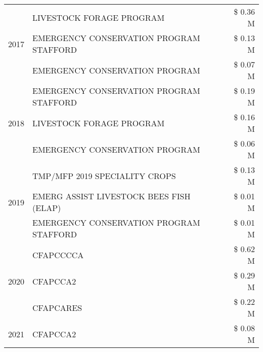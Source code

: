 \begin{tabular}{llr}
\cline{1-3}
\multirow[t]{3}{*}{2017} & LIVESTOCK FORAGE PROGRAM & \$ 0.36 M \\
 & EMERGENCY CONSERVATION PROGRAM STAFFORD & \$ 0.13 M \\
 & EMERGENCY CONSERVATION PROGRAM & \$ 0.07 M \\
\cline{1-3}
\multirow[t]{3}{*}{2018} & EMERGENCY CONSERVATION PROGRAM STAFFORD & \$ 0.19 M \\
 & LIVESTOCK FORAGE PROGRAM & \$ 0.16 M \\
 & EMERGENCY CONSERVATION PROGRAM & \$ 0.06 M \\
\cline{1-3}
\multirow[t]{3}{*}{2019} & TMP/MFP 2019 SPECIALITY CROPS & \$ 0.13 M \\
 & EMERG ASSIST LIVESTOCK BEES FISH (ELAP) & \$ 0.01 M \\
 & EMERGENCY CONSERVATION PROGRAM STAFFORD & \$ 0.01 M \\
\cline{1-3}
\multirow[t]{3}{*}{2020} & CFAPCCCCA & \$ 0.62 M \\
 & CFAPCCA2 & \$ 0.29 M \\
 & CFAPCARES & \$ 0.22 M \\
\cline{1-3}
2021 & CFAPCCA2 & \$ 0.08 M \\
\cline{1-3}
\bottomrule
\end{tabular}
